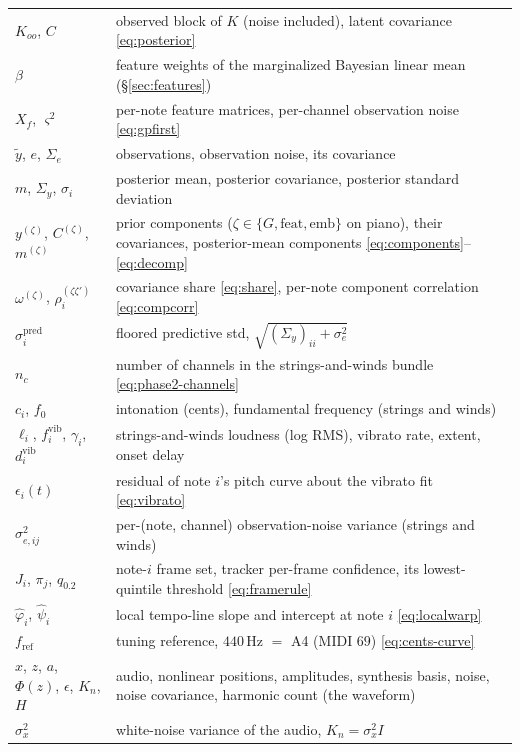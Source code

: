 \documentclass[11pt,a4paper]{report}
\newcommand{\Sy}{\Sigma_y}             %
\begin{document}
\begin{center}
\begin{longtable}{@{}p{4.3cm}p{9.2cm}@{}}
$K_{oo}$, $C$ & observed block of $K$ (noise included), latent covariance \eqref{eq:posterior} \\
$\beta$ & feature weights of the marginalized Bayesian linear mean (\S\ref{sec:features}) \\
$X_f$, $\varsigma^2$ & per-note feature matrices, per-channel observation noise \eqref{eq:gpfirst} \\
$\tilde y$, $e$, $\Sigma_e$ & observations, observation noise, its covariance \\
$m$, $\Sy$, $\sigma_i$ & posterior mean, posterior covariance, posterior standard deviation \\
$y^{(\zeta)}$, $C^{(\zeta)}$, $m^{(\zeta)}$ & prior components ($\zeta \in \{G, \mathrm{feat}, \mathrm{emb}\}$ on piano), their covariances, posterior-mean components \eqref{eq:components}--\eqref{eq:decomp} \\
$\omega^{(\zeta)}$, $\rho^{(\zeta\zeta')}_i$ & covariance share \eqref{eq:share}, per-note component correlation \eqref{eq:compcorr} \\
$\sigma_i^{\mathrm{pred}}$ & floored predictive std, $\sqrt{(\Sy)_{ii} + \sigma_e^2}$ \\
$n_c$ & number of channels in the strings-and-winds bundle \eqref{eq:phase2-channels} \\
$c_i$, $f_0$ & intonation (cents), fundamental frequency (strings and winds) \\
$\ell_i$, $f_i^{\mathrm{vib}}$, $\gamma_i$, $d_i^{\mathrm{vib}}$ & strings-and-winds loudness (log RMS), vibrato rate, extent, onset delay \\
$\epsilon_i(t)$ & residual of note $i$'s pitch curve about the vibrato fit \eqref{eq:vibrato} \\
$\sigma_{e,ij}^2$ & per-(note, channel) observation-noise variance (strings and winds) \\
$J_i$, $\pi_j$, $q_{0.2}$ & note-$i$ frame set, tracker per-frame confidence, its lowest-quintile threshold \eqref{eq:framerule} \\
$\hat\varphi_i$, $\hat\psi_i$ & local tempo-line slope and intercept at note $i$ \eqref{eq:localwarp} \\
$f_{\mathrm{ref}}$ & tuning reference, $440$\,Hz $=$ A4 (MIDI $69$) \eqref{eq:cents-curve} \\
$x$, $z$, $a$, $\Phi(z)$, $\epsilon$, $K_n$, $H$ & audio, nonlinear positions, amplitudes, synthesis basis, noise, noise covariance, harmonic count (the waveform) \\
$\sigma_x^2$ & white-noise variance of the audio, $K_n = \sigma_x^2 I$ \\

\end{longtable}
\end{center}
\end{document}
